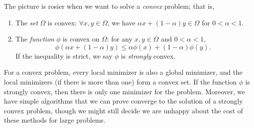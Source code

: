 \documentclass[12pt, leqno]{article} %
\begin{document}
The picture is rosier when we want to solve a {\em convex} problem; that is,
\begin{enumerate}
\item The {\em set} $\Omega$ is convex: $\forall x, y \in \Omega$, 
  we have $\alpha x + (1-\alpha) y \in \Omega$ for $0 < \alpha < 1$.
\item The {\em function} $\phi$ is convex on $\Omega$:
  for any $x, y \in \Omega$ and $0 < \alpha < 1$,
  \[
    \phi\left( \alpha x + (1-\alpha) y\right) \leq
    \alpha \phi(x) + (1-\alpha) \phi(y).
  \]
  If the inequality is strict, we say $\phi$ is {\em strongly} convex.
\end{enumerate}
For a convex problem, every local minimizer is also a global
minimizer, and the local minimizers (if there is more than one) form a
convex set.  If the function $\phi$ is strongly convex, then there is
only one minimizer for the problem.  Moreover, we have simple
algorithms that we can prove converge to the solution of a strongly
convex problem, though we might still decide we are unhappy about the
cost of these methods for large problems.
\end{document}
